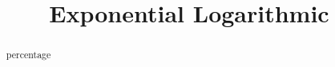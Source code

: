 \documentclass{ximera}
\title{Exponential Logarithmic}
\begin{document}
\begin{abstract}
percentage
\end{abstract}
\maketitle
\end{document}
